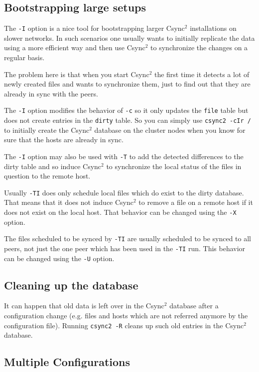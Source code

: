 \documentclass[a4paper,twocolumn]{article}
\def\csync2{{\sc Csync$^{2}$}}
\begin{document}
\subsection{Bootstrapping large setups}

The {\tt -I} option is a nice tool for bootstrapping larger \csync2
installations on slower networks. In such scenarios one usually wants to
initially replicate the data using a more efficient way and then use \csync2 to
synchronize the changes on a regular basis.

The problem here is that when you start \csync2 the first time it detects a lot
of newly created files and wants to synchronize them, just to find out that
they are already in sync with the peers.

The {\tt -I} option modifies the behavior of {\tt -c} so it only updates the
{\tt file} table but does not create entries in the {\tt dirty} table. So you
can simply use {\tt csync2 -cIr /} to initially create the \csync2 database on
the cluster nodes when you know for sure that the hosts are already in sync.

The {\tt -I} option may also be used with {\tt -T} to add the detected
differences to the dirty table and so induce \csync2 to synchronize the local
status of the files in question to the remote host.

Usually {\tt -TI} does only schedule local files which do exist to the dirty
database. That means that it does not induce \csync2 to remove a file on a
remote host if it does not exist on the local host. That behavior can be
changed using the {\tt -X} option.

The files scheduled to be synced by {\tt -TI} are usually scheduled to be
synced to all peers, not just the one peer which has been used in the {\tt -TI}
run. This behavior can be changed using the {\tt -U} option.

\subsection{Cleaning up the database}

It can happen that old data is left over in the \csync2 database after a
configuration change (e.g. files and hosts which are not referred anymore
by the configuration file). Running {\tt csync2 -R} cleans up such old
entries in the \csync2 database.

\subsection{Multiple Configurations}
\end{document}
